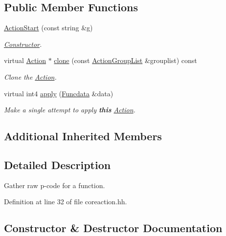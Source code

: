 \subsection*{Public Member Functions}
\begin{DoxyCompactItemize}
\item 
\mbox{\hyperlink{class_action_start_a837fbad221311d5407cd64f1cab9654f}{Action\+Start}} (const string \&g)
\begin{DoxyCompactList}\small\item\em \mbox{\hyperlink{class_constructor}{Constructor}}. \end{DoxyCompactList}\item 
virtual \mbox{\hyperlink{class_action}{Action}} $\ast$ \mbox{\hyperlink{class_action_start_af8fffe0d933032d6c1e18ef97266d871}{clone}} (const \mbox{\hyperlink{class_action_group_list}{Action\+Group\+List}} \&grouplist) const
\begin{DoxyCompactList}\small\item\em Clone the \mbox{\hyperlink{class_action}{Action}}. \end{DoxyCompactList}\item 
virtual int4 \mbox{\hyperlink{class_action_start_a9e21953bb17c18610189c3d28b1ab0a9}{apply}} (\mbox{\hyperlink{class_funcdata}{Funcdata}} \&data)
\begin{DoxyCompactList}\small\item\em Make a single attempt to apply {\bfseries{this}} \mbox{\hyperlink{class_action}{Action}}. \end{DoxyCompactList}\end{DoxyCompactItemize}
\subsection*{Additional Inherited Members}


\subsection{Detailed Description}
Gather raw p-\/code for a function. 

Definition at line 32 of file coreaction.\+hh.



\subsection{Constructor \& Destructor Documentation}
\mbox{\label{class_action_start_a837fbad221311d5407cd64f1cab9654f}} 
